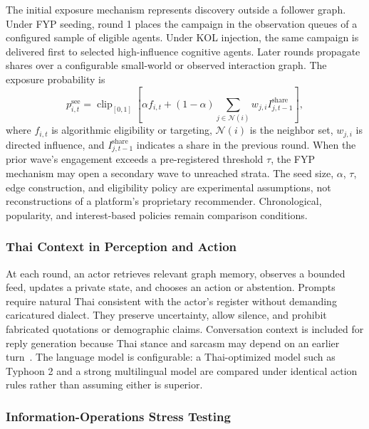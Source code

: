 \documentclass[conference]{IEEEtran}
\begin{document}
The initial exposure mechanism represents discovery outside a follower graph.
Under FYP seeding, round 1 places the campaign in the observation queues of a
configured sample of eligible agents. Under KOL injection, the same campaign is
delivered first to selected high-influence cognitive agents. Later rounds
propagate shares over a configurable small-world or observed interaction graph.
The exposure probability is
\begin{equation}
    p^{\mathrm{see}}_{i,t}=\operatorname{clip}_{[0,1]}\!\left[
    \alpha f_{i,t}+(1-\alpha)
    \sum_{j\in\mathcal{N}(i)}w_{j,i}
    I^{\mathrm{share}}_{j,t-1}\right],
    \label{eq:algorithmic-exposure}
\end{equation}
where $f_{i,t}$ is algorithmic eligibility or targeting, $\mathcal{N}(i)$ is
the neighbor set, $w_{j,i}$ is directed influence, and
$I^{\mathrm{share}}_{j,t-1}$ indicates a share in the previous round. When the
prior wave's engagement exceeds a pre-registered threshold $\tau$, the FYP mechanism may
open a secondary wave to unreached strata. The seed size, $\alpha$, $\tau$,
edge construction, and eligibility policy are experimental assumptions, not
reconstructions of a platform's proprietary recommender. Chronological,
popularity, and interest-based policies remain comparison conditions.

\subsubsection{Thai Context in Perception and Action}

At each round, an actor retrieves relevant graph memory, observes a bounded
feed, updates a private state, and chooses an action or abstention. Prompts
require natural Thai consistent with the actor's register without demanding
caricatured dialect. They preserve uncertainty, allow silence, and prohibit
fabricated quotations or demographic claims. Conversation context is included
for reply generation because Thai stance and sarcasm may depend on an earlier
turn~\cite{hazarika2018cascade}. The language model is configurable: a
Thai-optimized model such as Typhoon 2 and a strong multilingual model are
compared under identical action rules rather than assuming either is superior.

\subsubsection{Information-Operations Stress Testing}
\end{document}
